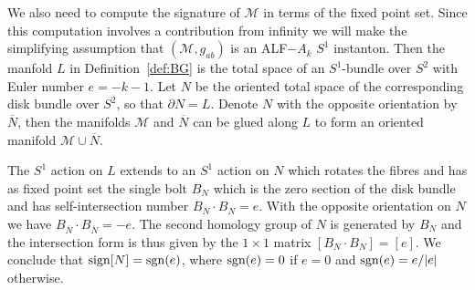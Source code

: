 \documentclass[a4paper,11pt,reqno]{amsart}
\newcommand{\sgn}{\mathop{\rm sgn}}
\newcommand{\sign}{\mathop{\rm sign}}
\newcommand{\cM}{\mathcal{M}}
\theoremstyle{plain}
\numberwithin{equation}{section}
\begin{document}
We also need to compute the signature of $\cM$ in terms of the fixed point set. Since this computation involves a contribution from infinity we will make the simplifying assumption that $(\cM, g_{ab})$ is an ALF$-A_k$ $S^1$ instanton. Then the manfold $L$ in Definition~\ref{def:BG} is the total space of an $S^1$-bundle over $S^2$ with Euler number $e = -k-1$. Let $N$ be the oriented total space of the corresponding disk bundle over $S^2$, so that $\partial N = L$. Denote $N$ with the opposite orientation by $\overline{N}$, then the manifolds $\cM$ and $\overline{N}$ can be glued along $L$ to form an oriented manifold $\cM \cup \overline{N}$. 

The $S^1$ action on $L$ extends to an $S^1$ action on $N$ which rotates the fibres and has as fixed point set the single bolt $B_N$ which is the zero section of the disk bundle and has self-intersection number $B_N \!\cdot\! B_N = e$. With the opposite orientation on $N$ we have $B_{\overline{N}} \! \cdot \! B_{\overline{N}} = -e$. The second homology group of $N$ is generated by $B_N$ and the intersection form is thus given by the $1 \times 1$ matrix $[B_N \! \cdot \! B_N] = [e]$. We conclude that $\sign[N] = \sgn(e)$, where $\sgn(e) = 0$ if $e=0$ and $\sgn(e) = e/|e|$ otherwise.
\end{document}
